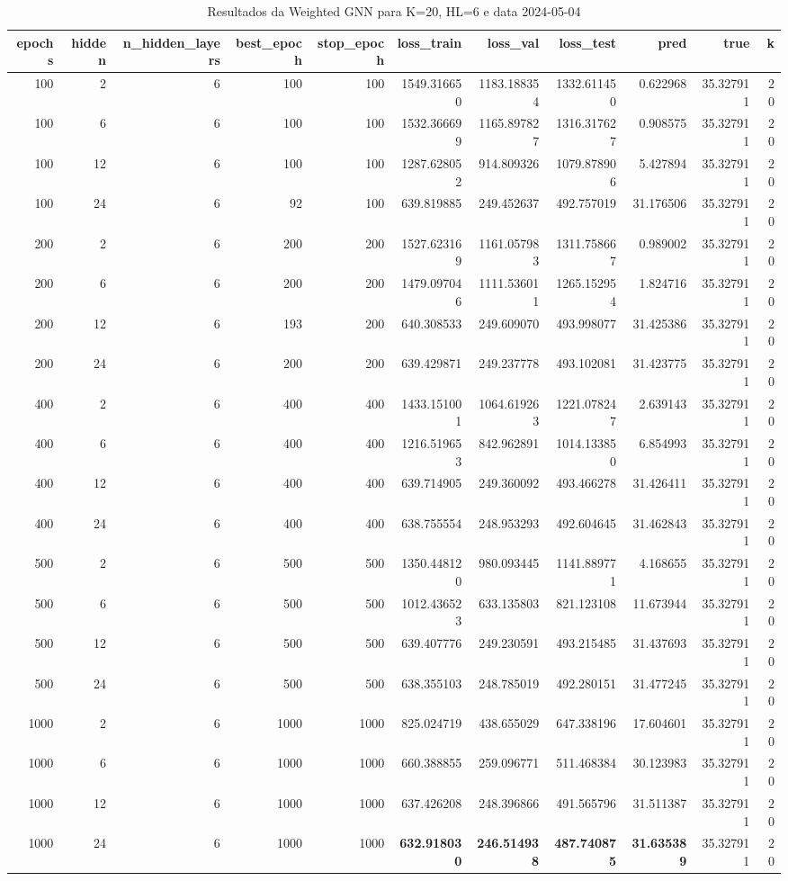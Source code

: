 \begin{table}
\caption{Resultados da Weighted GNN para K=20, HL=6 e data 2024-05-04}
\label{tab:weighted_gnn_results_k20_hl6_d20240504}
\begin{tabular}{rrrrrrrrrrr}
\toprule
epochs & hidden & n\_hidden\_layers & best\_epoch & stop\_epoch & loss\_train & loss\_val & loss\_test & pred & true & k \\
\midrule
100 & 2 & 6 & 100 & 100 & 1549.316650 & 1183.188354 & 1332.611450 & 0.622968 & 35.327911 & 20 \\
100 & 6 & 6 & 100 & 100 & 1532.366699 & 1165.897827 & 1316.317627 & 0.908575 & 35.327911 & 20 \\
100 & 12 & 6 & 100 & 100 & 1287.628052 & 914.809326 & 1079.878906 & 5.427894 & 35.327911 & 20 \\
100 & 24 & 6 & 92 & 100 & 639.819885 & 249.452637 & 492.757019 & 31.176506 & 35.327911 & 20 \\
200 & 2 & 6 & 200 & 200 & 1527.623169 & 1161.057983 & 1311.758667 & 0.989002 & 35.327911 & 20 \\
200 & 6 & 6 & 200 & 200 & 1479.097046 & 1111.536011 & 1265.152954 & 1.824716 & 35.327911 & 20 \\
200 & 12 & 6 & 193 & 200 & 640.308533 & 249.609070 & 493.998077 & 31.425386 & 35.327911 & 20 \\
200 & 24 & 6 & 200 & 200 & 639.429871 & 249.237778 & 493.102081 & 31.423775 & 35.327911 & 20 \\
400 & 2 & 6 & 400 & 400 & 1433.151001 & 1064.619263 & 1221.078247 & 2.639143 & 35.327911 & 20 \\
400 & 6 & 6 & 400 & 400 & 1216.519653 & 842.962891 & 1014.133850 & 6.854993 & 35.327911 & 20 \\
400 & 12 & 6 & 400 & 400 & 639.714905 & 249.360092 & 493.466278 & 31.426411 & 35.327911 & 20 \\
400 & 24 & 6 & 400 & 400 & 638.755554 & 248.953293 & 492.604645 & 31.462843 & 35.327911 & 20 \\
500 & 2 & 6 & 500 & 500 & 1350.448120 & 980.093445 & 1141.889771 & 4.168655 & 35.327911 & 20 \\
500 & 6 & 6 & 500 & 500 & 1012.436523 & 633.135803 & 821.123108 & 11.673944 & 35.327911 & 20 \\
500 & 12 & 6 & 500 & 500 & 639.407776 & 249.230591 & 493.215485 & 31.437693 & 35.327911 & 20 \\
500 & 24 & 6 & 500 & 500 & 638.355103 & 248.785019 & 492.280151 & 31.477245 & 35.327911 & 20 \\
1000 & 2 & 6 & 1000 & 1000 & 825.024719 & 438.655029 & 647.338196 & 17.604601 & 35.327911 & 20 \\
1000 & 6 & 6 & 1000 & 1000 & 660.388855 & 259.096771 & 511.468384 & 30.123983 & 35.327911 & 20 \\
1000 & 12 & 6 & 1000 & 1000 & 637.426208 & 248.396866 & 491.565796 & 31.511387 & 35.327911 & 20 \\
1000 & 24 & 6 & 1000 & 1000 & \textbf{632.918030} & \textbf{246.514938} & \textbf{487.740875} & \textbf{31.635389} & 35.327911 & 20 \\
\bottomrule
\end{tabular}
\end{table}

